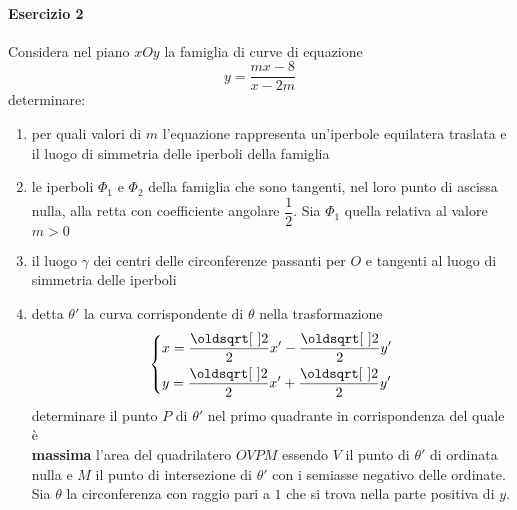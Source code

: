 \paragraph{Esercizio 2}
Considera nel piano $xOy$ la famiglia di curve di equazione
\begin{equation*}
  y=\frac{mx-8}{x-2m}
\end{equation*}
determinare:
\begin{enumerate}
  \item per quali valori di $m$ l'equazione rappresenta un'iperbole equilatera traslata e il luogo
    di simmetria delle iperboli della famiglia \label{enum:ex:aff:2:1}
  \item le iperboli $\Phi_1$ e $\Phi_2$ della famiglia che sono tangenti, nel loro punto di ascissa
    nulla, alla retta con coefficiente angolare $\dfrac{1}{2}$. Sia $\Phi_1$ quella relativa al valore
    $m>0$ \label{enum:ex:aff:2:2}
  \item il luogo $\gamma$ dei centri delle circonferenze passanti per $O$ e tangenti al luogo
    di simmetria delle iperboli \label{enum:ex:aff:2:3}
  \item detta $\theta'$ la curva corrispondente di $\theta$ nella trasformazione
    \label{enum:ex:aff:2:4}
    \begin{equation*}
      \begin{dcases}
        x = \frac{\sqrt{2}}{2}x'-\frac{\sqrt{2}}{2}y'\\
        y = \frac{\sqrt{2}}{2}x'+\frac{\sqrt{2}}{2}y'
      \end{dcases}
    \end{equation*}
    determinare il punto $P$ di $\theta'$ nel primo quadrante in corrispondenza del quale è \\
    \textbf{massima} l'area del quadrilatero $OVPM$ essendo $V$ il punto di $\theta'$ di ordinata
    nulla e $M$ il punto di intersezione di $\theta'$ con i semiasse negativo delle ordinate.
    Sia $\theta$ la circonferenza con raggio pari a $1$ che si trova nella parte positiva di $y$.
\end{enumerate}
\divisor

